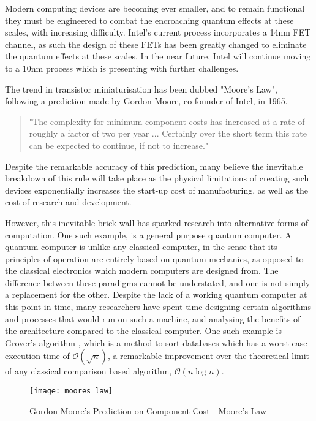 Modern computing devices are becoming ever smaller, and to remain functional they must be engineered to combat the encroaching quantum effects at these scales, with increasing difficulty. Intel's current process incorporates a 14nm FET channel, as such the design of these FETs has been greatly changed to eliminate the quantum effects at these scales. \cite{intel_process} In the near future, Intel will continue moving to a 10nm process which is presenting with further challenges. \cite{intel_future}

The trend in transistor miniaturisation has been dubbed "Moore's Law", following a prediction made by Gordon Moore, co-founder of Intel, in 1965. \cite{moore1965cramming}

\begin{quotation}
	"The complexity for minimum component costs has increased at a rate of roughly a factor of
	 two per year ... Certainly over the short term this rate
	can be expected to continue, if not to increase." 
\end{quotation}
Despite the remarkable accuracy of this prediction, many believe \cite{end_of_Moore_1, end_of_Moore_2} the inevitable breakdown of this rule will take place as the physical limitations of creating such devices exponentially increases the start-up cost of manufacturing, as well as the cost of research and development.

However, this inevitable brick-wall has sparked research into alternative forms of computation. One such example, is a general purpose quantum computer. A quantum computer is unlike any classical computer, in the sense that its principles of operation are entirely based on quantum mechanics, as opposed to the classical electronics which modern computers are designed from. The difference between these paradigms cannot be understated, and one is not simply a replacement for the other. Despite the lack of a working quantum computer at this point in time, many researchers have spent time designing certain algorithms and processes that would run on such a machine, and analysing the benefits of the architecture compared to the classical computer. One such example is Grover's algorithm \cite{grover1996fast}, which is a method to sort databases which has a worst-case execution time of $\mathcal{O}(\sqrt{n})$, a remarkable improvement over the theoretical limit of any classical comparison based algorithm, $\mathcal{O}(n \log{n})$.



\begin{figure}[htbp!]
	\centering
	\texttt{[image: moores\_law]}
	\caption{Gordon Moore's Prediction on Component Cost - Moore's Law}
	\label{fig::moores_law}
\end{figure}
